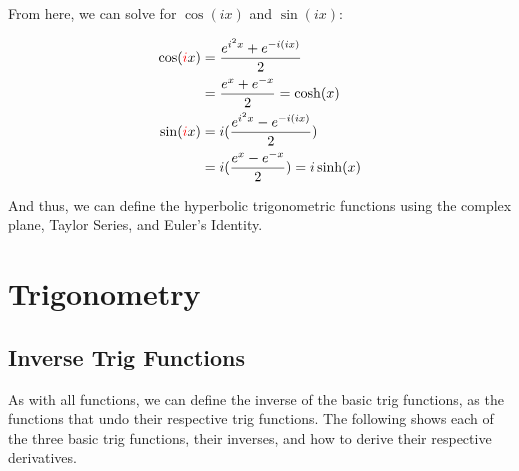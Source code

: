 \documentclass[12pt]{article}
\begin{document}
From here, we can solve for $\cos(ix)$ and $\sin(ix)$:


\begin{equation}
    \begin{split}
        \cos(\textcolor{red}{i}x) &= \frac{e^{i^2 x}+e^{-i(ix)}}{2}\\
        &= \frac{e^x+e^{-x}}{2} = \cosh(x)\\
        \sin(\textcolor{red}{i} x) &= i(\frac{e^{i^2 x}-e^{-i(ix)}}{2})\\
        &= i(\frac{e^x-e^{-x}}{2}) = i \sinh(x)\\
    \end{split}
\end{equation}

And thus, we can define the hyperbolic trigonometric functions using the complex plane, Taylor Series, and Euler's Identity. 

\section{Trigonometry}
\subsection{Inverse Trig Functions}
As with all functions, we can define the inverse of the basic trig functions, as the functions that undo their respective trig functions. The following shows each of the three basic trig functions, their inverses, and how to derive their respective derivatives.
\end{document}
